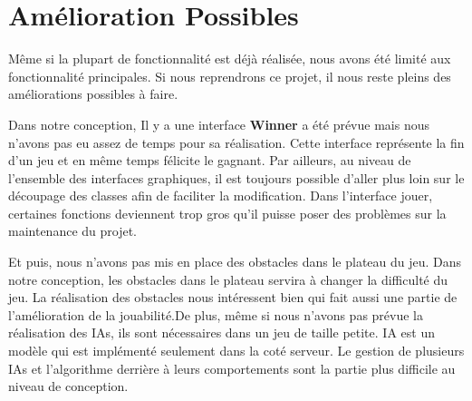 \section{Amélioration Possibles}
Même si la plupart de fonctionnalité est déjà réalisée, nous avons été limité aux fonctionnalité principales. Si nous reprendrons ce projet, il nous reste pleins des améliorations possibles à faire.

Dans notre conception, Il y a une interface \textbf{Winner} a été prévue mais nous n'avons pas eu assez de temps pour sa réalisation. Cette interface représente la fin d'un jeu et en même temps félicite le gagnant. Par ailleurs, au niveau de l'ensemble des interfaces graphiques, il est toujours possible d'aller plus loin sur le découpage des classes afin de faciliter la modification. Dans l'interface jouer, certaines fonctions deviennent trop gros qu'il puisse poser des problèmes sur la maintenance du projet.    

Et puis, nous n'avons pas mis en place des obstacles dans le plateau du jeu. Dans notre conception, les obstacles dans le plateau servira à changer la difficulté du jeu. La réalisation des obstacles nous intéressent bien qui fait aussi une partie de l'amélioration de la jouabilité.De plus, même si nous n'avons pas prévue la réalisation des IAs, ils sont nécessaires dans un jeu de taille petite. IA est un modèle qui est implémenté seulement dans la coté serveur. Le gestion de plusieurs IAs et l'algorithme derrière à leurs comportements sont la partie plus difficile au niveau de conception.